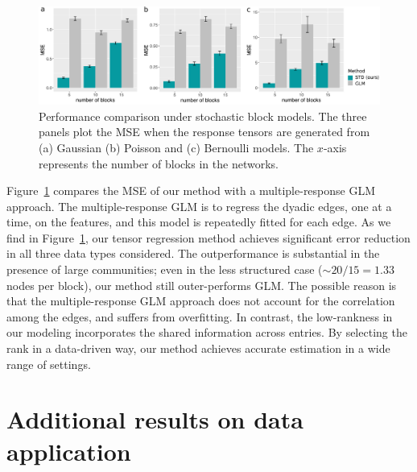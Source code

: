 \documentclass[12pt]{article}
\theoremstyle{definition}
\begin{document}
\begin{figure}[ht]
\centering
\includegraphics[width=16cm]{compare_GLM.pdf}
\caption{Performance comparison under stochastic block models. The three panels plot the MSE when the response tensors are generated from (a) Gaussian (b) Poisson and (c) Bernoulli models. The $x$-axis represents the number of blocks in the networks. }\label{fig:glm}
\end{figure}


Figure~\ref{fig:glm} compares the MSE of our method with a multiple-response GLM approach. The multiple-response GLM is to regress the dyadic edges, one at a time, on the features, and this model is repeatedly fitted for each edge. As we find in Figure~\ref{fig:glm}, our tensor regression method achieves significant error reduction in all three data types considered. The outperformance is substantial in the presence of large communities; even in the less structured case ($\sim 20/15=1.33$ nodes per block), our method still outer-performs GLM. The possible reason is that the multiple-response GLM approach does not account for the correlation among the edges, and suffers from overfitting. In contrast, the low-rankness in our modeling incorporates the shared information across entries. By selecting the rank in a data-driven way, our method achieves accurate estimation in a wide range of settings. 


\section{Additional results on data application}\label{sec:adata}
\end{document}
